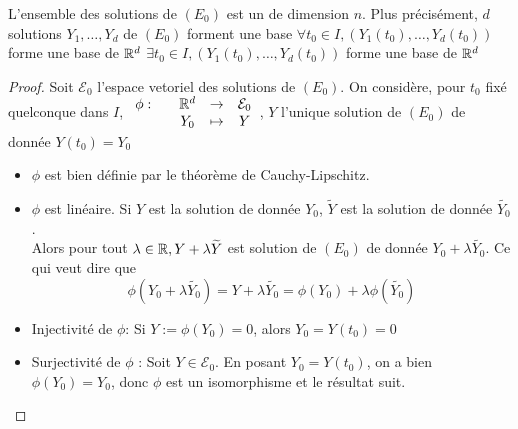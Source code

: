\documentclass[]{report}
\begin{document}
\begin{cor}{}{}
    L'ensemble des solutions de $(E_0)$ est un \ev de dimension $n$. Plus précisément, $d$ solutions $Y_1,\ldots,Y_d$ de $(E_0)$ forment une base \ssi $\forall t_0\in I, (Y_1(t_0),\ldots,Y_d(t_0))$ forme une base de $\mathbb{R}^d$ \ssi $\exists t_0\in I,(Y_1(t_0),\ldots,Y_d(t_0))$ forme une base de $\mathbb{R}^d$
\end{cor}

\begin{proof}{}{}
    Soit $\mathcal{E}_0$ l'espace vetoriel des solutions de $(E_0)$. On considère, pour $t_0$ fixé quelconque dans $I$, $\begin{array}{ccccc} \phi : & & \mathbb{R}^d & \to & \mathcal{E}_0 \\ & & Y_0 & \mapsto & Y \end{array}$, $Y$ l'unique solution de $(E_0)$ de donnée $Y(t_0)=Y_0$
    \begin{itemize}
        \item $\phi$ est bien définie par le théorème de Cauchy-Lipschitz.
        \item $\phi$ est linéaire. Si $Y$ est la solution de donnée $Y_0$, $\widetilde{Y}$ est la solution de donnée $\widetilde{Y_0}$.\\
        Alors pour tout $\lambda\in \mathbb{R}, Y+\lambda \widetilde{Y}$ est solution de $(E_0)$ de donnée $Y_0+\lambda \widetilde{Y_0}$. Ce qui veut dire que
        \[\phi(Y_0+\lambda \widetilde{Y_0})=Y+\lambda \widetilde{Y_0}=\phi(Y_0)+\lambda \phi(\widetilde{Y_0})\]
        \item Injectivité de $\phi$: Si $Y:=\phi(Y_0)=0$, alors $Y_0=Y(t_0)=0$
        \item Surjectivité de $\phi$ : Soit $Y\in \mathcal{E}_0$. En posant $Y_0=Y(t_0)$, on a bien $\phi(Y_0)=Y_0$, donc $\phi$ est un isomorphisme et le résultat suit.
    \end{itemize}
\end{proof}
\end{document}
